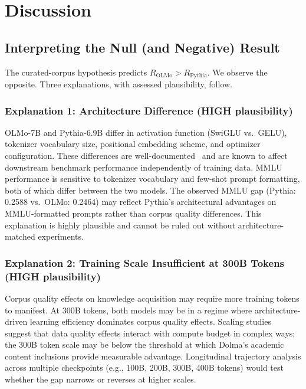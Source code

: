 \section{Discussion}

\subsection{Interpreting the Null (and Negative) Result}

The curated-corpus hypothesis predicts $R_{\text{OLMo}} > R_{\text{Pythia}}$. We observe the opposite. Three explanations, with assessed plausibility, follow.

\subsubsection{Explanation 1: Architecture Difference (HIGH plausibility)}

OLMo-7B and Pythia-6.9B differ in activation function (SwiGLU vs.\ GELU), tokenizer vocabulary size, positional embedding scheme, and optimizer configuration. These differences are well-documented~\cite{Groeneveld2024OLMo,Biderman2023Pythia} and are known to affect downstream benchmark performance independently of training data. MMLU performance is sensitive to tokenizer vocabulary and few-shot prompt formatting, both of which differ between the two models. The observed MMLU gap (Pythia: 0.2588 vs.\ OLMo: 0.2464) may reflect Pythia's architectural advantages on MMLU-formatted prompts rather than corpus quality differences. This explanation is highly plausible and cannot be ruled out without architecture-matched experiments.

\subsubsection{Explanation 2: Training Scale Insufficient at 300B Tokens (HIGH plausibility)}

Corpus quality effects on knowledge acquisition may require more training tokens to manifest. At 300B tokens, both models may be in a regime where architecture-driven learning efficiency dominates corpus quality effects. Scaling studies~\cite{Muennighoff2023Scaling} suggest that data quality effects interact with compute budget in complex ways; the 300B token scale may be below the threshold at which Dolma's academic content inclusions provide measurable advantage. Longitudinal trajectory analysis across multiple checkpoints (e.g., 100B, 200B, 300B, 400B tokens) would test whether the gap narrows or reverses at higher scales.

